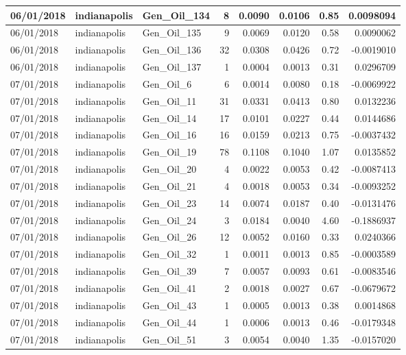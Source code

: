 \documentclass[
  letterpaper,
  DIV=11,
  numbers=noendperiod]{scrartcl}
\begin{document}
\begin{tabular}{l|l|l|r|r|r|r|r}
\hline
06/01/2018 & indianapolis & Gen\_Oil\_134 & 8 & 0.0090 & 0.0106 & 0.85 & 0.0098094\\
\hline
06/01/2018 & indianapolis & Gen\_Oil\_135 & 9 & 0.0069 & 0.0120 & 0.58 & 0.0090062\\
\hline
06/01/2018 & indianapolis & Gen\_Oil\_136 & 32 & 0.0308 & 0.0426 & 0.72 & -0.0019010\\
\hline
06/01/2018 & indianapolis & Gen\_Oil\_137 & 1 & 0.0004 & 0.0013 & 0.31 & 0.0296709\\
\hline
07/01/2018 & indianapolis & Gen\_Oil\_6 & 6 & 0.0014 & 0.0080 & 0.18 & -0.0069922\\
\hline
07/01/2018 & indianapolis & Gen\_Oil\_11 & 31 & 0.0331 & 0.0413 & 0.80 & 0.0132236\\
\hline
07/01/2018 & indianapolis & Gen\_Oil\_14 & 17 & 0.0101 & 0.0227 & 0.44 & 0.0144686\\
\hline
07/01/2018 & indianapolis & Gen\_Oil\_16 & 16 & 0.0159 & 0.0213 & 0.75 & -0.0037432\\
\hline
07/01/2018 & indianapolis & Gen\_Oil\_19 & 78 & 0.1108 & 0.1040 & 1.07 & 0.0135852\\
\hline
07/01/2018 & indianapolis & Gen\_Oil\_20 & 4 & 0.0022 & 0.0053 & 0.42 & -0.0087413\\
\hline
07/01/2018 & indianapolis & Gen\_Oil\_21 & 4 & 0.0018 & 0.0053 & 0.34 & -0.0093252\\
\hline
07/01/2018 & indianapolis & Gen\_Oil\_23 & 14 & 0.0074 & 0.0187 & 0.40 & -0.0131476\\
\hline
07/01/2018 & indianapolis & Gen\_Oil\_24 & 3 & 0.0184 & 0.0040 & 4.60 & -0.1886937\\
\hline
07/01/2018 & indianapolis & Gen\_Oil\_26 & 12 & 0.0052 & 0.0160 & 0.33 & 0.0240366\\
\hline
07/01/2018 & indianapolis & Gen\_Oil\_32 & 1 & 0.0011 & 0.0013 & 0.85 & -0.0003589\\
\hline
07/01/2018 & indianapolis & Gen\_Oil\_39 & 7 & 0.0057 & 0.0093 & 0.61 & -0.0083546\\
\hline
07/01/2018 & indianapolis & Gen\_Oil\_41 & 2 & 0.0018 & 0.0027 & 0.67 & -0.0679672\\
\hline
07/01/2018 & indianapolis & Gen\_Oil\_43 & 1 & 0.0005 & 0.0013 & 0.38 & 0.0014868\\
\hline
07/01/2018 & indianapolis & Gen\_Oil\_44 & 1 & 0.0006 & 0.0013 & 0.46 & -0.0179348\\
\hline
07/01/2018 & indianapolis & Gen\_Oil\_51 & 3 & 0.0054 & 0.0040 & 1.35 & -0.0157020\\

\end{tabular}
\end{document}
